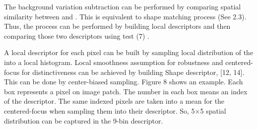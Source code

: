 \documentclass[conference]{IEEEtran}
\begin{document}
The background variation subtraction can be performed by comparing spatial similarity between   and  . This is equivalent to shape matching process (See 2.3). Thus, the process can be performed by building local descriptors and then comparing those two descriptors using   test (7) .

A local descriptor for each pixel can be built by sampling local distribution of the   into a local histogram. Local smoothness assumption for robustness and centered-focus for distinctiveness can be achieved by building Shape descriptor, [12, 14]. This can be done by center-biased sampling. Figure 8 shows an example. Each box represents a pixel on image patch. The number in each box means an index of the descriptor. The same indexed pixels are taken into a mean for the centered-focus when sampling them into their descriptor. So, 5×5 spatial distribution can be captured in the 9-bin descriptor. 
\end{document}
